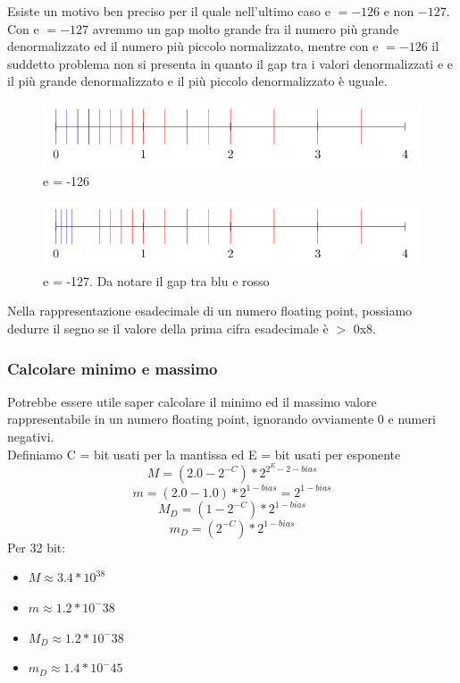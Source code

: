 \documentclass{report}
\begin{document}
        Esiste un motivo ben preciso per il quale nell'ultimo caso e $=-126$
        e non $-127$. Con e $=-127$ avremmo un gap molto grande fra il numero
        più grande denormalizzato ed il numero più piccolo normalizzato, mentre
        con e $=-126$ il suddetto problema non si presenta in quanto il gap tra 
        i valori denormalizzati e e il più grande denormalizzato e il più piccolo 
        denormalizzato è uguale.
        \begin{center}
            \begin{figure}[h]
                \includegraphics[width=\textwidth]{buono.png}
                \caption{e = -126}
            \end{figure}
            \begin{figure}[h]
                \includegraphics[width=\textwidth]{cattivo.png}
                \caption{e = -127. Da notare il gap tra blu e rosso}
            \end{figure}
        \end{center}          
        Nella rappresentazione esadecimale di un numero floating point, 
        possiamo dedurre il segno se il valore della prima cifra esadecimale
        è $>$ 0x8.
        \subsubsection{Calcolare minimo e massimo}
            Potrebbe essere utile saper calcolare il minimo 
            ed il massimo valore rappresentabile in un numero floating point, 
            ignorando ovviamente 0 e numeri negativi. \\
            Definiamo C = bit usati per la mantissa ed E = bit usati per esponente
            $$M = (2.0-2^{-C}) * 2^{2^E-2-bias}$$
            $$m = (2.0 - 1.0) * 2^{1-bias} = 2^{1-bias}$$
            $$M_D =  (1 - 2^{-C}) * 2^{1-bias}$$
            $$m_D = (2^{-C}) * 2^{1-bias}$$ 
            Per 32 bit:
            \begin{itemize}
                \item $M \approx 3.4 * 10^38$
                \item $m \approx 1.2 * 10^-38$
                \item $M_D \approx 1.2 * 10^-38$
                \item $m_D \approx 1.4 * 10^-45$
            \end{itemize}
\end{document}
